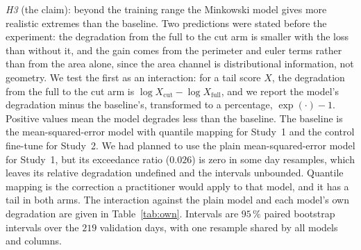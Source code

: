 \documentclass{article}
\begin{document}
\emph{H3} (the claim): beyond the training range the Minkowski model gives more realistic extremes than the baseline.
Two predictions were stated before the experiment: the degradation from the full to the cut arm is smaller with the
loss than without it, and the gain comes from the perimeter and euler terms rather than from the area alone, since the
area channel is distributional information, not geometry. We test the first as an interaction: for a tail score $X$, the degradation from the full to the cut arm is
$\log X_{\mathrm{cut}} - \log X_{\mathrm{full}}$, and we report the model's degradation minus the baseline's,
transformed to a percentage, $\exp(\cdot) - 1$. Positive values mean the model degrades less than the baseline. The
baseline is the mean-squared-error model with quantile mapping for Study~1 and the control fine-tune for Study~2. We
had planned to use the plain mean-squared-error model for Study~1, but its exceedance ratio ($0.026$) is zero in some
day resamples, which leaves its relative degradation undefined and the intervals unbounded. Quantile mapping is the
correction a practitioner would apply to that model, and it has a tail in both arms. The interaction against the plain
model and each model's own degradation are given in Table~\ref{tab:own}. Intervals are $95\,\%$
paired bootstrap intervals over the $219$ validation days, with one resample shared by all models and columns.
\end{document}
